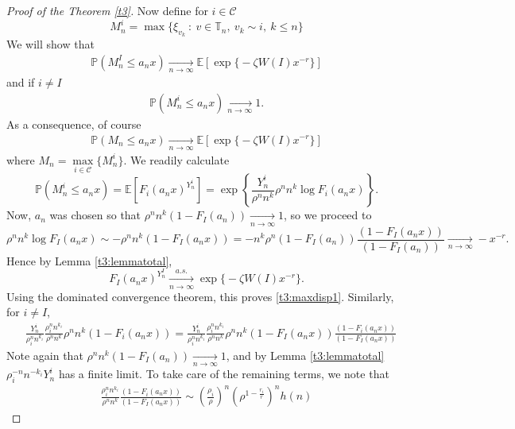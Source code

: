 \documentclass[12pt]{article}
\numberwithin{equation}{section}
\begin{document}
\begin{proof}[Proof of the Theorem \ref{t3}]
Now define for $i \in \mathcal{C}$
\[
M^i_n = \max\{\xi_{v_k} \ : \ v \in \mathbb{T}_n, \ v_k \sim i, \ k\leq n\}
\]
We will show that 
\begin{align}\label{t3:maxdisp1}
    \mathbb{P}\left(M^I_n \leq a_n x\right) \xrightarrow[ n \rightarrow \infty]{} \mathbb{E}\left[ \exp \big\{ - \zeta W(I) x^{-r} \big\}\right]
\end{align}
and if $i \neq I$
\begin{align}\label{t3:maxdisp2}
    \mathbb{P}\left(M^i_n \leq a_n x\right) \xrightarrow[ n \rightarrow \infty]{} 1.
\end{align}
As a consequence, of course 
\begin{align}\label{t3:maxdisp3}
        \mathbb{P}\left(M_n \leq a_n x\right) \xrightarrow[ n \rightarrow \infty]{} \mathbb{E}\left[ \exp \big\{ - \zeta W(I) x^{-r} \big\}\right]
\end{align}
where $M_n = \max\limits_{i \in \mathcal{C}} \{M^i_n\}$.
We readily calculate
\[
\mathbb{P}\left(M^i_n \leq a_n x\right) = \mathbb{E} \left[ F_i(a_nx)^{Y^i_n}\right] =   \exp{\left\{\frac {Y^i_n} {\rho^n n^k} \rho^n n^k \log F_i(a_n x)\right\}} .
\]
 Now, $a_n$ was chosen so that $\rho^n n^k (1- F_I(a_n )) \xrightarrow[ n \rightarrow \infty]{}  1$, so we proceed to
\[
\rho^n n^k \log F_I(a_n x) \sim -\rho^n n^k (1- F_I(a_n x )) = -n^k\rho^n (1- F_I(a_n) ) \frac { (1- F_I(a_n x )) } {(1- F_I(a_n ))} \xrightarrow[ n \rightarrow \infty]{} -x^{-r}.
\]
Hence by Lemma \ref{t3:lemmatotal}, \[F_I(a_nx)^{Y^I_n} \xrightarrow[ n \rightarrow \infty]{a.s.}  \exp \big\{ -\zeta W(I) x^{-r} \big\}.\]
 Using the dominated convergence theorem, this proves \eqref{t3:maxdisp1}. Similarly, for $i\neq I$,
\begin{equation}
\begin{aligned}\label{t3:eq1}
   &\frac {Y^i_n} {\rho_i^n n^{k_i}} \frac {\rho_i^n n^{k_i}} {\rho^n n^{k}} \rho^n n^k \left( 1-  F_i(a_n x) \right)=  \frac {Y^i_n} {\rho_i^n n^{k_i}} \frac {\rho_i^n n^{k_i}} {\rho^n n^{k}} \rho^n n^k (1- F_I(a_n x) ) \frac { (1- F_i(a_n x )) } {(1- F_I(a_n x ))} 
\end{aligned}
\end{equation}
Note again that $\rho^n n^k (1- F_I(a_n )) \xrightarrow[ n \rightarrow \infty]{}  1$, and by Lemma \ref{t3:lemmatotal} $\rho_i^{-n}n^{-k_i} Y^i_n$ has a finite limit. To take care of the remaining terms, we note that
\begin{align}\label{t3:eq2}
 \frac {\rho_i^n n^{k_i}} {\rho^n n^{k}}\frac { (1- F_i(a_n x )) } {(1- F_I(a_n x ))} \sim \left(\frac {\rho_i} {\rho} \right)^n \left(\rho^{1-\frac { r_i} {r}  }\right)^n  h(n)

\end{align}
\end{proof}
\end{document}

